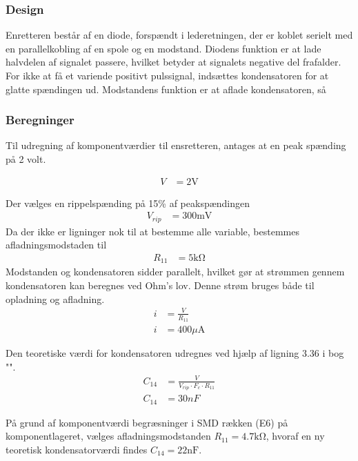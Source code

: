 \subsubsection{Design}
Enretteren består af en diode, forspændt i lederetningen, der er koblet serielt med en parallelkobling af en spole og en modstand. 
Diodens funktion er at lade halvdelen af signalet passere, hvilket betyder at signalets negative del frafalder. 
For ikke at få et variende positivt pulssignal, indsættes kondensatoren for at glatte spændingen ud. Modstandens funktion er at aflade kondensatoren, så



\subsubsection{Beregninger}
Til udregning af komponentværdier til ensretteren, antages at en peak spænding på 2 volt.

\begin{align}
	V & = 2 \si{\volt} \nonumber
\end{align}

Der vælges en rippelspænding på 15\% af peakspændingen
\begin{align}
	V_{rip} & = 300 \si{\milli\volt} \nonumber
\end{align}
Da der ikke er ligninger nok til at bestemme alle variable, bestemmes afladningsmodstaden til
\begin{align}
	R_{11} & = 5 \si{\kilo\ohm} \nonumber
\end{align}
Modstanden og kondensatoren sidder parallelt, hvilket gør at strømmen gennem kondensatoren kan beregnes ved Ohm's lov. Denne strøm bruges både til opladning og afladning.
\begin{align}
	i & = \frac{V}{R_{11}} \\
	i & = 400 \si{\mu\ampere}\nonumber
\end{align}

Den teoretiske værdi for kondensatoren udregnes ved hjælp af ligning 3.36 i bog "\cite[side. 160]{Sedra19uu}".
\begin{align}
	C_{14} & = \frac{V}{V_{rip} \cdot F_c \cdot R_{11}}\\
		C_{14} & = 30nF \nonumber
\end{align}

	
På grund af komponentværdi begræsninger i SMD rækken (E6) på komponentlageret, vælges afladningsmodstanden $R_{11} = 4.7 \si{\kilo\ohm}$, hvoraf en ny teoretisk kondensatorværdi findes $C_{14} = 22 \si{\nano\farad}$.


